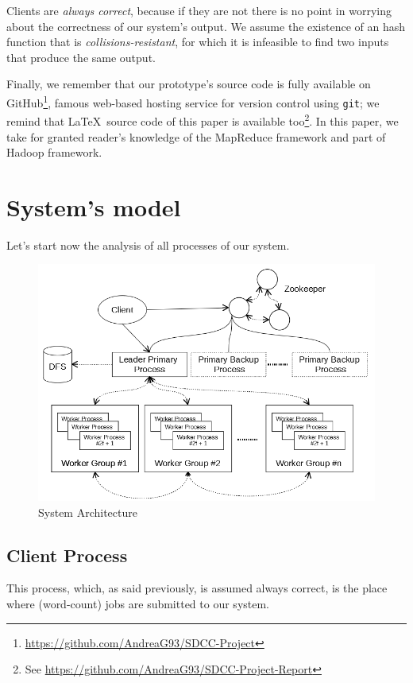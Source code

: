 \documentclass[sigchi]{acmart}
\begin{document}
Clients are \textit{always correct}, because if they are not there is no point in worrying about the correctness of our system's output. We assume the existence of an hash function that is \textit{collisions-resistant}, for which it is infeasible to find two inputs that produce the same output.

Finally, we remember that our prototype's source code is fully available on GitHub\footnote{\url{https://github.com/AndreaG93/SDCC-Project}}, famous web-based hosting service for version control using \texttt{git}; we remind that \LaTeX\ source code of this paper is available too\footnote{See \url{https://github.com/AndreaG93/SDCC-Project-Report}}. In this paper, we take for granted reader's knowledge of the MapReduce framework and part of Hadoop framework.

\section{System's model}

Let's start now the analysis of all processes of our system.

\begin{figure}[h]
  \centering
  \includegraphics[width=\linewidth]{Architecture.png}
  \caption{System Architecture}
  \label{fig:model}
\end{figure}

\subsection{Client Process}

This process, which, as said previously, is assumed always correct, is the place where (word-count) jobs are submitted to our system. 
\end{document}
